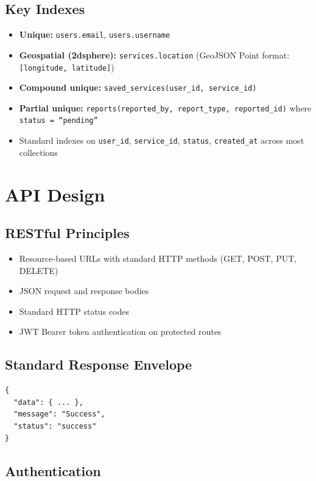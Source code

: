 \documentclass[11pt,a4paper]{report}
\begin{document}
\subsection{Key Indexes}

\begin{itemize}
    \item \textbf{Unique:} \texttt{users.email}, \texttt{users.username}
    \item \textbf{Geospatial (2dsphere):} \texttt{services.location} (GeoJSON Point format: \texttt{[longitude, latitude]})
    \item \textbf{Compound unique:} \texttt{saved\_services(user\_id, service\_id)}
    \item \textbf{Partial unique:} \texttt{reports(reported\_by, report\_type, reported\_id)} where \texttt{status = ``pending''}
    \item Standard indexes on \texttt{user\_id}, \texttt{service\_id}, \texttt{status}, \texttt{created\_at} across most collections
\end{itemize}

\section{API Design}

\subsection{RESTful Principles}

\begin{itemize}
    \item Resource-based URLs with standard HTTP methods (GET, POST, PUT, DELETE)
    \item JSON request and response bodies
    \item Standard HTTP status codes
    \item JWT Bearer token authentication on protected routes
\end{itemize}

\subsection{Standard Response Envelope}

\begin{lstlisting}
{
  "data": { ... },
  "message": "Success",
  "status": "success"
}
\end{lstlisting}

\subsection{Authentication}
\end{document}
